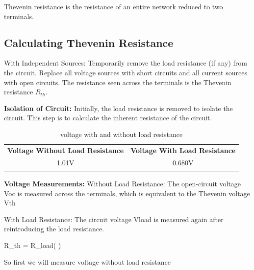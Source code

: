 \documentclass[a4paper,11pt]{article}%
\begin{document}
Thevenin resistance is the resistance of an entire network reduced to two terminals.


\subsection{Calculating Thevenin Resistance}

    With Independent Sources: Temporarily remove the load resistance (if any) from the circuit. Replace all voltage sources with short circuits and all current sources with open circuits. The resistance seen across the terminals is the Thevenin resistance $R_{th}$.

	\textbf{Isolation of Circuit:} Initially, the load resistance is removed to isolate the circuit. This step is to calculate the inherent resistance of the circuit.


	\begin{table}[!h]
		\centering
	
		\begin{tabular}{c c}
	
			\textbf{Voltage Without Load Resistance}&\textbf{Voltage With Load Resistance}\\
			
			1.01V&0.680V\\\vspace{0.5cm}

		\end{tabular}
		\caption{voltage with and without load resistance}
		\label{voltagewithandwithoutresistance}
	\end{table}

	\textbf{Voltage Measurements:}
		Without Load Resistance: The open-circuit voltage Voc
  is measured across the terminals, which is equivalent to the Thevenin voltage Vth

		With Load Resistance: The circuit voltage Vload
  is measured again after reintroducing the load resistance.

	\begin{flalign*}
	\label{equation_th}
	R_{th} = R_{load}\left( \right)
	\end{flalign*}

	\pagebreak

	So first we will measure voltage without load resistance
\end{document}
